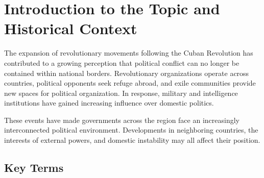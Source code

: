 \section{Introduction to the Topic and Historical Context}


The expansion of revolutionary movements following the Cuban Revolution has contributed to a growing perception that political conflict can no longer be contained within national borders. Revolutionary organizations operate across countries, political opponents seek refuge abroad, and exile communities provide new spaces for political organization. In response, military and intelligence institutions have gained increasing influence over domestic politics.

These events have made governments across the region face an increasingly interconnected political environment. Developments in neighboring countries, the interests of external powers, and domestic instability may all affect their position.

\subsection{Key Terms}

